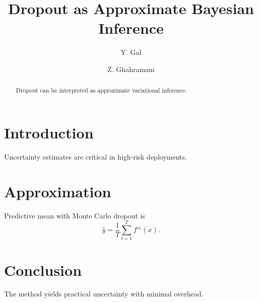 \documentclass[sigconf]{acmart}
\begin{document}
\title{Dropout as Approximate Bayesian Inference}
\author{Y. Gal}
\author{Z. Ghahramani}
\begin{abstract}
Dropout can be interpreted as approximate variational inference.
\end{abstract}

\renewcommand\footnotetextcopyrightpermission[1]{}
\maketitle
\thispagestyle{plain}
\pagestyle{plain}
\section{Introduction}
Uncertainty estimates are critical in high-risk deployments.

\FloatBarrier
\section{Approximation}
Predictive mean with Monte Carlo dropout is
\begin{equation}
\hat{y}=\frac{1}{T}\sum_{t=1}^{T} f^{\omega_t}(x).
\end{equation}

\FloatBarrier
\section{Conclusion}
The method yields practical uncertainty with minimal overhead.

\FloatBarrier


\end{document}
